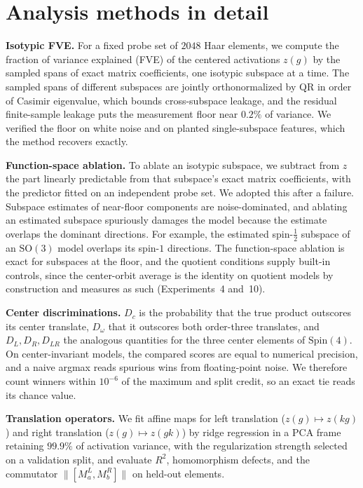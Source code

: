 \documentclass{article}
\newcommand{\SO}{\mathrm{SO}}
\newcommand{\Spin}{\mathrm{Spin}}
\begin{document}
\section{Analysis methods in detail}
\label{app:methods}

\textbf{Isotypic FVE.} For a fixed probe set of $2048$ Haar elements,
we compute the fraction of variance explained (FVE) of the centered
activations $z(g)$ by the sampled spans of exact matrix coefficients,
one isotypic subspace at a time. The sampled spans of different
subspaces are jointly orthonormalized by QR in order of Casimir
eigenvalue, which bounds cross-subspace leakage, and the residual
finite-sample leakage puts the measurement floor near $0.2\%$ of
variance. We verified the floor on white noise and on planted
single-subspace features, which the method recovers exactly.

\textbf{Function-space ablation.} To ablate an isotypic subspace, we
subtract from $z$ the part linearly predictable from that subspace's
exact matrix coefficients, with the predictor fitted on an independent
probe set. We adopted this after a failure. Subspace estimates of
near-floor components are noise-dominated, and ablating an estimated
subspace spuriously damages the model because the estimate overlaps
the dominant directions. For example, the estimated spin-$\tfrac12$
subspace of an $\SO(3)$ model overlaps its spin-$1$ directions. The
function-space ablation is exact for subspaces at the floor, and the
quotient conditions supply built-in controls, since the center-orbit
average is the identity on quotient models by construction and
measures as such (Experiments~4 and~10).

\textbf{Center discriminations.} $D_c$ is the probability that the
true product outscores its center translate, $D_\omega$ that it
outscores both order-three translates, and $D_L, D_R, D_{LR}$ the
analogous quantities for the three center elements of $\Spin(4)$. On
center-invariant models, the compared scores are equal to numerical
precision, and a naive argmax reads spurious wins from floating-point
noise. We therefore count winners within $10^{-6}$ of the maximum and
split credit, so an exact tie reads its chance value.

\textbf{Translation operators.} We fit affine maps for left
translation ($z(g) \mapsto z(kg)$) and right translation
($z(g) \mapsto z(gk)$) by ridge regression in a PCA frame retaining
$99.9\%$ of activation variance, with the regularization strength
selected on a validation split, and evaluate $R^2$, homomorphism
defects, and the commutator $\lVert [M^L_a, M^R_b]\rVert$ on held-out
elements.
\end{document}
